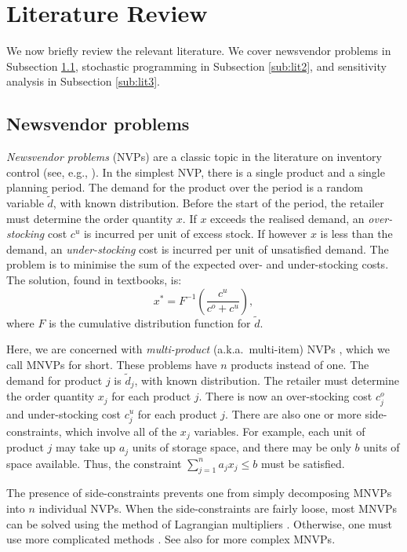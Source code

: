 \documentclass[a4paper,11pt]{article}
\begin{document}
\section{Literature Review} \label{se:literature}

We now briefly review the relevant literature. We cover newsvendor problems
in Subsection \ref{sub:lit1}, stochastic programming in Subsection
\ref{sub:lit2}, and sensitivity analysis in Subsection \ref{sub:lit3}.

\subsection{Newsvendor problems} \label{sub:lit1}

\emph{Newsvendor problems} (NVPs) are a classic topic in the literature
on inventory control (see, e.g., \cite{Ch12,HW63,Po02,SPP98,Zi00}). In the simplest NVP, there is a single product and a single planning period. The
demand for the product over the period is a random variable $\tilde d$,
with known distribution. Before the start of the period, the retailer must
determine the order quantity $x$. If $x$ exceeds the realised demand, an \emph{over-stocking} cost $c^u$ is incurred per unit of excess stock. If
however $x$ is less than the demand, an \emph{under-stocking} cost is
incurred per unit of unsatisfied demand. The problem is to minimise the
sum of the expected over- and under-stocking costs. The solution, found
in textbooks, is:
\[
    x^* = F^{-1}\left( \frac{c^u}{c^o+c^u} \right),
\]
where $F$ is the cumulative distribution function for $\tilde d$.

Here, we are concerned with \emph{multi-product} (a.k.a.\ multi-item) NVPs
\cite{HW63}, which we call MNVPs for short. These problems have $n$ products
instead of one. The demand for product $j$ is $\tilde d_j$, with known
distribution. The retailer must determine the order quantity $x_j$ for each
product $j$. There is now an over-stocking cost $c^o_j$ and under-stocking
cost $c^u_j$ for each product $j$. There are also one or more
side-constraints, which involve all of the $x_j$ variables. For example,
each unit of product $j$ may take up $a_j$ units of storage space, and
there may be only $b$ units of space available. Thus, the constraint
$\sum_{j=1}^n a_j x_j \le b$ must be satisfied.

The presence of side-constraints prevents one from simply decomposing
MNVPs into $n$ individual NVPs. When the side-constraints are fairly loose,
most MNVPs can be solved using the method of Lagrangian multipliers
\cite{BR93,HW63}. Otherwise, one must use more complicated methods
\cite{AM05,LL95,ZXH09}. See also \cite{BAA99,Ch12,Tu12,Zh10} for more
complex MNVPs.
\end{document}
